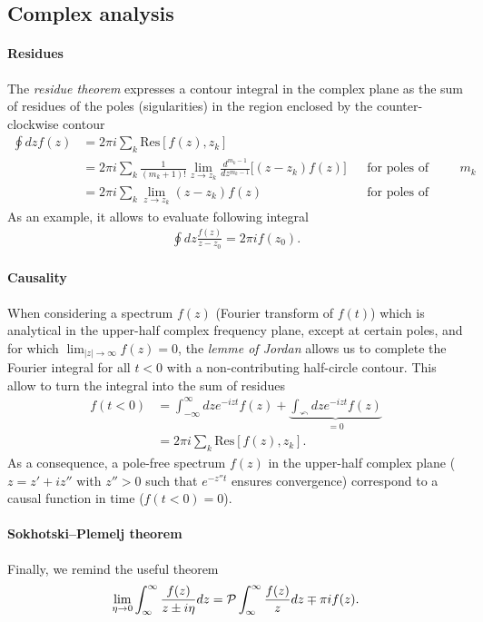 \documentclass[notitlepage, 11pt, nofootinbib]{revtex4-1}
\begin{document}
\subsection{Complex analysis}

\paragraph*{Residues} The \emph{residue theorem} expresses a contour integral in the complex plane as the sum of residues of the poles (sigularities) in the region enclosed by the counter-clockwise contour
\begin{align}
\oint dz f(z) 
&= 
2\pi i \sum_{k}\text{Res}[f(z),z_k]
\label{residue}
\\
&=
2\pi i \sum_{k}
\frac{1}{(m_k+1)!}
\lim_{z\rightarrow z_k}
\frac{d^{{m_k-1}}}{dz^{m_k-1}}
\Big[(z-z_k)f(z)\Big]
\label{residue_order_m}
&&\text{for poles of order $m_k$}
\\
&=
2\pi i \sum_{k}
\lim_{z\rightarrow z_k}
(z-z_k)f(z)
\label{residue_order_1}
&&\text{for poles of order 1}
\end{align}
As an example, it allows to evaluate following integral
\begin{align}
\oint dz \frac{f(z)}{z-z_0} = 2\pi i f(z_{0}).
\label{simplest_residue}
\end{align}

\paragraph*{Causality} When considering a spectrum $f(z)$ (Fourier transform of $f(t)$) which is analytical in the upper-half complex frequency plane, except at certain poles, and for which $\lim_{|z|\rightarrow\infty} f(z) = 0$, the \emph{lemme of Jordan} allows us to complete the Fourier integral for all $t<0$ with a non-contributing half-circle contour. This allow to turn the integral into the sum of residues
\begin{align}
f(t<0)
&=
\int_{-\infty}^{\infty} dz e^{-iz t} f(z)
+ \underbrace{
\int_{\curvearrowleft} dz e^{-iz t}f(z)
}_{=0}
\label{causal1}
\\&= 
2\pi i \sum_{k}\text{Res}[f(z),z_k].
\label{causal2}
\end{align}
As a consequence, a pole-free spectrum $f(z)$ in the upper-half complex plane ($z=z'+iz''$ with $z''>0$ such that $e^{-z''t}$ ensures convergence) correspond to a causal function in time ($f(t<0)=0$).

\paragraph*{Sokhotski–Plemelj theorem} Finally, we remind the useful theorem
\begin{align}
\lim_{\eta\rightarrow 0}\int_{\-\infty}^{\infty} \frac{f(z)}{z \pm i\eta} dz
=  
\mathcal P \int_{\-\infty}^{\infty} \frac{f(z)}{z} dz \mp \pi i f(z).
\label{Sokhotski_Plemelj}
\end{align}
\end{document}
